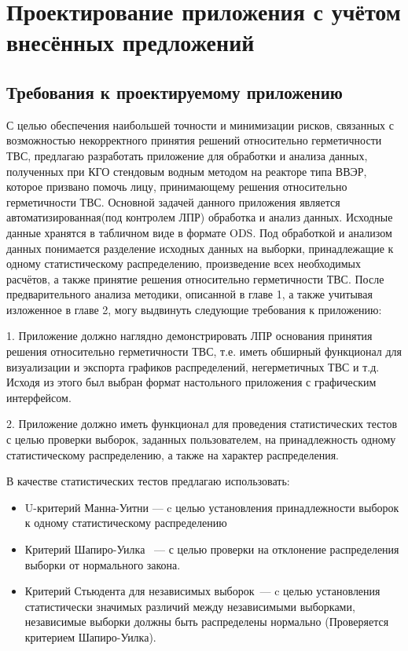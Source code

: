 
\section{Проектирование приложения с учётом внесённых предложений}

\subsection{Требования к проектируемому приложению}\label{trebovaniya}

С целью обеспечения наибольшей точности и минимизации рисков,
связанных с возможностью некорректного принятия решений относительно
герметичности ТВС, предлагаю разработать приложение для обработки и анализа данных, полученных при КГО стендовым водным методом на реакторе типа ВВЭР, которое призвано помочь лицу, принимающему решения относительно
герметичности ТВС. Основной задачей данного приложения является автоматизированная(под контролем ЛПР) обработка и анализ данных. Исходные данные хранятся в табличном виде в формате ODS. Под обработкой и анализом данных понимается разделение исходных данных на выборки, принадлежащие к
одному статистическому распределению, произведение всех необходимых
расчётов, а также принятие решения относительно герметичности ТВС. После предварительного анализа методики, описанной в главе 1, а также учитывая изложенное в главе 2, могу выдвинуть следующие требования к приложению:

1. Приложение должно наглядно демонстрировать ЛПР основания принятия
решения относительно герметичности ТВС, т.е. иметь обширный функционал
для визуализации и экспорта графиков распределений, негерметичных ТВС и т.д. Исходя из этого был выбран формат настольного приложения с графическим интерфейсом.

2. Приложение должно иметь функционал для проведения статистических тестов с целью проверки выборок, заданных пользователем, на принадлежность одному статистическому распределению, а также на характер распределения.

В качестве статистических тестов предлагаю использовать:
\begin{itemize}
	\item U-критерий Манна-Уитни --- c целью установления принадлежности выборок к одному статистическому распределению
	\item Критерий Шапиро-Уилка~\cite{RANstat} --- с целью проверки на отклонение распределения выборки от нормального закона.
	\item Критерий Стьюдента для независимых выборок~--- c целью установления статистически значимых различий между независимыми выборками, независимые выборки должны быть распределены нормально (Проверяется критерием Шапиро-Уилка).
\end{itemize}

